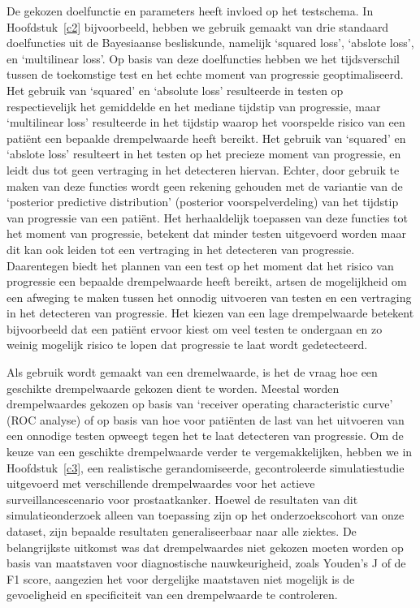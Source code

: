 De gekozen doelfunctie en parameters heeft invloed op het testschema. In Hoofdstuk~\ref{c2} bijvoorbeeld, hebben we gebruik gemaakt van drie standaard doelfuncties uit de Bayesiaanse besliskunde, namelijk `squared loss', `abslote loss', en `multilinear loss'. Op basis van deze doelfuncties hebben we het tijdsverschil tussen de toekomstige test en het echte moment van progressie geoptimaliseerd. Het gebruik van `squared' en `absolute loss' resulteerde in testen op respectievelijk het gemiddelde en het mediane tijdstip van progressie, maar `multilinear loss' resulteerde in het tijdstip waarop het voorspelde risico van een patiënt een bepaalde drempelwaarde heeft bereikt. Het gebruik van `squared' en `abslote loss' resulteert in het testen op het precieze moment van progressie, en leidt dus tot geen vertraging in het detecteren hiervan. Echter, door gebruik te maken van deze functies wordt geen rekening gehouden met de variantie van de `posterior predictive distribution' (posterior voorspelverdeling) van het tijdstip van progressie van een patiënt. Het herhaaldelijk toepassen van deze functies tot het moment van progressie, betekent dat minder testen uitgevoerd worden maar dit kan ook leiden tot een vertraging in het detecteren van progressie. Daarentegen biedt het plannen van een test op het moment dat het risico van progressie een bepaalde drempelwaarde heeft bereikt, artsen de mogelijkheid om een afweging te maken tussen het onnodig uitvoeren van testen en een vertraging in het detecteren van progressie. Het kiezen van een lage drempelwaarde betekent bijvoorbeeld dat een patiënt ervoor kiest om veel testen te ondergaan en zo weinig mogelijk risico te lopen dat progressie te laat wordt gedetecteerd.

Als gebruik wordt gemaakt van een dremelwaarde, is het de vraag hoe een geschikte drempelwaarde gekozen dient te worden. Meestal worden drempelwaardes gekozen op basis van `receiver operating characteristic curve' (ROC analyse) of op basis van hoe voor patiënten de last van het uitvoeren van een onnodige testen opweegt tegen het te laat detecteren van progressie. Om de keuze van een geschikte drempelwaarde verder te vergemakkelijken, hebben we in Hoofdstuk~\ref{c3}, een realistische gerandomiseerde, gecontroleerde simulatiestudie uitgevoerd met verschillende drempelwaardes voor het actieve surveillancescenario voor prostaatkanker. Hoewel de resultaten van dit simulatieonderzoek alleen van toepassing zijn op het onderzoekscohort van onze dataset, zijn bepaalde resultaten generaliseerbaar naar alle ziektes. De belangrijkste uitkomst was dat drempelwaardes niet gekozen moeten worden op basis van maatstaven voor diagnostische nauwkeurigheid, zoals Youden's J of de F1 score, aangezien het voor dergelijke maatstaven niet mogelijk is de gevoeligheid en specificiteit van een drempelwaarde te controleren.

